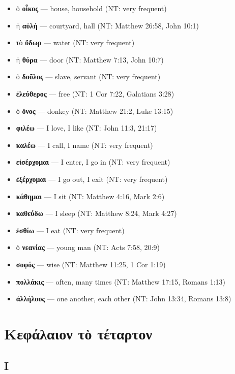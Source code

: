 \documentclass[a4paper]{report}
\begin{document}
\begin{itemize}
\tightlist
\item
  ὁ \textbf{οἶκος} --- house, household (NT: very frequent)
\item
  ἡ \textbf{αὐλή} --- courtyard, hall (NT: Matthew 26:58, John 10:1)
\item
  τὸ \textbf{ὕδωρ} --- water (NT: very frequent)
\item
  ἡ \textbf{θύρα} --- door (NT: Matthew 7:13, John 10:7)
\item
  ὁ \textbf{δοῦλος} --- slave, servant (NT: very frequent)
\item
  \textbf{ἐλεύθερος} --- free (NT: 1 Cor 7:22, Galatians 3:28)
\item
  ὁ \textbf{ὄνος} --- donkey (NT: Matthew 21:2, Luke 13:15)
\item
  \textbf{φιλέω} --- I love, I like (NT: John 11:3, 21:17)
\item
  \textbf{καλέω} --- I call, I name (NT: very frequent)
\item
  \textbf{εἰσέρχομαι} --- I enter, I go in (NT: very frequent)
\item
  \textbf{ἐξέρχομαι} --- I go out, I exit (NT: very frequent)
\item
  \textbf{κάθημαι} --- I sit (NT: Matthew 4:16, Mark 2:6)
\item
  \textbf{καθεύδω} --- I sleep (NT: Matthew 8:24, Mark 4:27)
\item
  \textbf{ἐσθίω} --- I eat (NT: very frequent)
\item
  ὁ \textbf{νεανίας} --- young man (NT: Acts 7:58, 20:9)
\item
  \textbf{σοφός} --- wise (NT: Matthew 11:25, 1 Cor 1:19)
\item
  \textbf{πολλάκις} --- often, many times (NT: Matthew 17:15, Romans
  1:13)
\item
  \textbf{ἀλλήλους} --- one another, each other (NT: John 13:34, Romans
  13:8)
\end{itemize}

\section{Κεφάλαιον τὸ
τέταρτον}\label{ux3baux3b5ux3c6ux3acux3bbux3b1ux3b9ux3bfux3bd-ux3c4ux1f78-ux3c4ux3adux3c4ux3b1ux3c1ux3c4ux3bfux3bd}

\subsection{Ι}\label{ux3b9-3}
\end{document}
